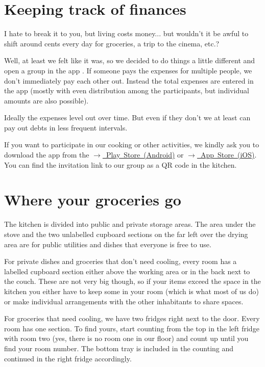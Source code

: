 \section{Keeping track of finances}
I hate to break it to you, but living costs money... but wouldn't it be awful to shift around cents every day for groceries, a trip to the cinema, etc.?

Well, at least we felt like it was, so we decided to do things a little different and open a group in the app . If someone pays the expenses for multiple people, we don't immediately pay each other out. Instead the total expenses are entered in the app (mostly with even distribution among the participants, but individual amounts are also possible).

Ideally the expenses level out over time. But even if they don't we at least can pay out debts in less frequent intervals.

If you want to participate in our cooking or other activities, we kindly ask you to download the app from the \mbox{\href{https://play.google.com/store/apps/details?id=com.Splitwise.SplitwiseMobile&hl=de&pli=1}{$\xrightarrow{}$ Play Store (Android)}} or \mbox{\href{https://apps.apple.com/de/app/splitwise/id458023433}{$\xrightarrow{}$ App Store (iOS)}}. You can find the invitation link to our group as a QR code in the kitchen.

\section{Where your groceries go}
The kitchen is divided into public and private storage areas. The area under the stove and the two unlabelled cupboard sections on the far left over the drying area are for public utilities and dishes that everyone is free to use.

For private dishes and groceries that don't need cooling, every room has a labelled cupboard section either above the working area or in the back next to the couch. These are not very big though, so if your items exceed the space in the kitchen you either have to keep some in your room (which is what most of us do) or make individual arrangements with the other inhabitants to share spaces. 

For groceries that need cooling, we have two fridges right next to the door. Every room has one section. To find yours, start counting from the top in the left fridge with room two (yes, there is no room one in our floor) and count up until you find your room number. The bottom tray is included in the counting and continued in the right fridge accordingly.

